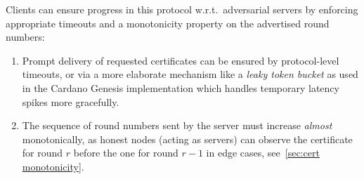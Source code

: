 Clients can ensure progress in this protocol w.r.t.\ adversarial servers by enforcing appropriate timeouts and a monotonicity property on the advertised round numbers:
\begin{enumerate}
\item\label{enumi:cert diffusion timeouts}
  Prompt delivery of requested certificates can be ensured by protocol-level timeouts, or via a more elaborate mechanism like a \emph{leaky token bucket} as used in the Cardano Genesis implementation  \parencite{genesis-implementation-documentation} which handles temporary latency spikes more gracefully.
\item\label{enumi:cert diffusion monotonicity}
  The sequence of round numbers sent by the server must increase \emph{almost} monotonically, as honest nodes (acting as servers) can observe the certificate for round $r$ before the one for round $r-1$ in edge cases, see~\cref{sec:cert monotonicity}.


\end{enumerate}


